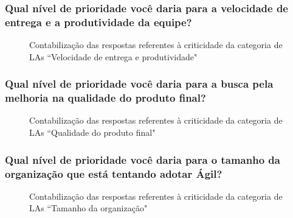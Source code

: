 \subsubsection{Qual nível de prioridade você daria para a velocidade de entrega e a produtividade da equipe?}

\begin{figure}[H]
	\centering
	\captionsetup{justification=centering}
	\caption{Contabilização das respostas referentes à criticidade da categoria de LAs ``Velocidade de entrega e produtividade"}
	\label{fig:result-produtividade}
\end{figure}

\subsubsection{Qual nível de prioridade você daria para a busca pela melhoria na qualidade do produto final?}

\begin{figure}[H]
	\centering
	\captionsetup{justification=centering}
	\caption{Contabilização das respostas referentes à criticidade da categoria de LAs ``Qualidade do produto final"}
	\label{fig:result-qualidade}
\end{figure}

\subsubsection{Qual nível de prioridade você daria para o tamanho da organização que está tentando adotar Ágil?}

\begin{figure}[H]
	\centering
	\captionsetup{justification=centering}
	\caption{Contabilização das respostas referentes à criticidade da categoria de LAs ``Tamanho da organização"}
	\label{fig:result-tamanho}
\end{figure}

